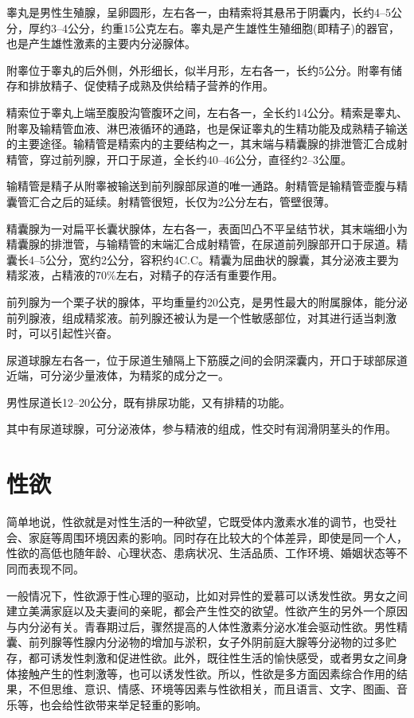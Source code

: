\documentclass[12pt,UTF8]{ctexbook}
\begin{document}
睾丸是男性生殖腺，呈卵圆形，左右各一，由精索将其悬吊于阴囊内，长约4--5公分，厚约3--4公分，约重15公克左右。睾丸是产生雄性生殖细胞(即精子)的器官，也是产生雄性激素的主要内分泌腺体。

附睾位于睾丸的后外侧，外形细长，似半月形，左右各一，长约5公分。附睾有储存和排放精子、促使精子成熟及供给精子营养的作用。

精索位于睾丸上端至腹股沟管腹环之间，左右各一，全长约14公分。精索是睾丸、附睾及输精管血液、淋巴液循环的通路，也是保证睾丸的生精功能及成熟精子输送的主要途径。输精管是精索内的主要结构之一，其末端与精囊腺的排泄管汇合成射精管，穿过前列腺，开口于尿道，全长约40--46公分，直径约2--3公厘。

输精管是精子从附睾被输送到前列腺部尿道的唯一通路。射精管是输精管壶腹与精囊管汇合之后的延续。射精管很短，长仅为2公分左右，管壁很薄。

精囊腺为一对扁平长囊状腺体，左右各一，表面凹凸不平呈结节状，其末端细小为精囊腺的排泄管，与输精管的末端汇合成射精管，在尿道前列腺部开口于尿道。精囊长4--5公分，宽约2公分，容积约4C.C。精囊为屈曲状的腺囊，其分泌液主要为精浆液，占精液的70\%左右，对精子的存活有重要作用。

前列腺为一个栗子状的腺体，平均重量约20公克，是男性最大的附属腺体，能分泌前列腺液，组成精浆液。前列腺还被认为是一个性敏感部位，对其进行适当刺激时，可以引起性兴奋。

尿道球腺左右各一，位于尿道生殖隔上下筋膜之间的会阴深囊内，开口于球部尿道近端，可分泌少量液体，为精浆的成分之一。

男性尿道长12--20公分，既有排尿功能，又有排精的功能。

其中有尿道球腺，可分泌液体，参与精液的组成，性交时有润滑阴茎头的作用。

\part{性欲}

简单地说，性欲就是对性生活的一种欲望，它既受体内激素水准的调节，也受社会、家庭等周围环境因素的影响。同时存在比较大的个体差异，即使是同一个人，性欲的高低也随年龄、心理状态、患病状况、生活品质、工作环境、婚姻状态等不同而表现不同。

一般情况下，性欲源于性心理的驱动，比如对异性的爱慕可以诱发性欲。男女之间建立美满家庭以及夫妻间的亲昵，都会产生性交的欲望。性欲产生的另外一个原因与内分泌有关。青春期过后，骤然提高的人体性激素分泌水准会驱动性欲。男性精囊、前列腺等性腺内分泌物的增加与淤积，女子外阴前庭大腺等分泌物的过多贮存，都可诱发性刺激和促进性欲。此外，既往性生活的愉快感受，或者男女之间身体接触产生的性刺激等，也可以诱发性欲。所以，性欲是多方面因素综合作用的结果，不但思维、意识、情感、环境等因素与性欲相关，而且语言、文字、图画、音乐等，也会给性欲带来举足轻重的影响。
\end{document}
